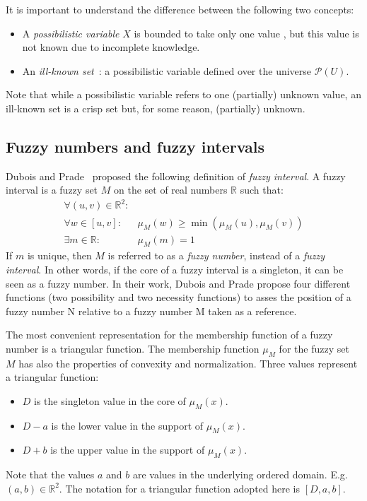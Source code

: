 \documentclass[twoside,twocolumn,a4paper]{article}
\newcommand{\Pow}{\mathcal{P}}
\begin{document}
It is important to understand the difference between the following two concepts:
\begin{itemize}
\item
A \emph{possibilistic variable} $X$ is bounded to take only one value , but this value is not known due to incomplete knowledge. 
\item
An \emph{ill-known set}~\cite{Dubois88b}: a possibilistic variable defined over the universe $\Pow(U)$.
\end{itemize}

Note that while a possibilistic variable refers to one (partially) unknown value, an ill-known set is a crisp set but, for some reason, (partially) unknown.


\subsection{\label{subsec:fuzzy-numbers}Fuzzy numbers and fuzzy intervals}
Dubois and Prade~\cite{Dubois1983} proposed the following definition of \emph{fuzzy interval}.
A fuzzy interval is a fuzzy set $M$ on the set of real numbers $\mathbb{R}$ such that:
\begin{eqnarray}
\forall (u,v)\in\mathbb{R}^2:&\\
\nonumber
\forall w \in [u,v]:&\mu_M(w) \geq\min(\mu_M(u),\mu_M(v))  \\
\exists m \in \mathbb{R}:& \mu_M(m)=1 
\end{eqnarray}
If $m$ is unique, then $M$ is referred to as a \emph{fuzzy number}, instead of a \emph{fuzzy interval}. In other words, if the core of a fuzzy interval is a singleton, it can be seen as a fuzzy number. In their work, Dubois and Prade propose four different functions (two possibility and two necessity functions) to asses the position of a fuzzy number N relative to  a fuzzy number M taken as a reference.

The most convenient representation for the membership function of a fuzzy number is a triangular function. The membership function $\mu_M$ for the fuzzy set $M$ has also the properties of convexity and normalization. Three values represent a triangular function: %
\begin{itemize}
\item
$D$ is the singleton value in the core of $\mu_M(x)$.
\item
$D-a$ is the lower value in the support of $\mu_M(x)$. 
\item
$D+b$ is the upper value in the support of $\mu_M(x)$.
\end{itemize}
Note that the values $a$ and $b$ are values in the underlying ordered domain. E.g. $(a,b) \in \mathbb{R}^2$. The notation for a triangular function adopted here is $[D,a,b]$.
\end{document}
